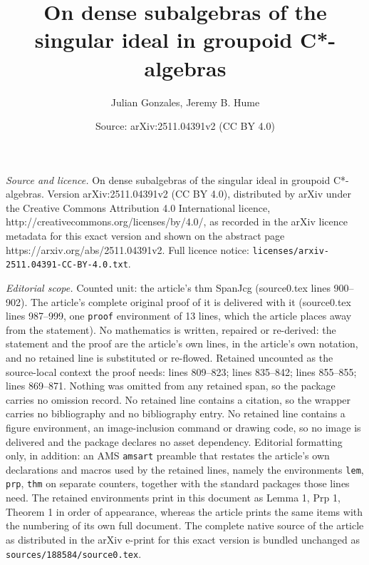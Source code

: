 \documentclass[10pt,a4paper]{amsart}
\title{On dense subalgebras of the singular ideal in groupoid C*-algebras}
\author{Julian Gonzales, Jeremy B. Hume}
\date{Source: arXiv:2511.04391v2 (CC BY 4.0)}
\begin{document}
\maketitle

\noindent\emph{Source and licence.} On dense subalgebras of the singular ideal in groupoid C*-algebras. Version arXiv:2511.04391v2 (CC BY 4.0), distributed by arXiv under the Creative Commons Attribution 4.0 International licence, http://creativecommons.org/licenses/by/4.0/, as recorded in the arXiv licence metadata for this exact version and shown on the abstract page https://arxiv.org/abs/2511.04391v2. Full licence notice: \texttt{licenses/arxiv-2511.04391-CC-BY-4.0.txt}.\par\smallskip

\noindent\textit{Editorial scope.} Counted unit: the article's thm SpanJcg (source0.tex lines 900--902). The article's complete original proof of it is delivered with it (source0.tex lines 987--999, one \texttt{proof} environment of 13 lines, which the article places away from the statement). No mathematics is written, repaired or re-derived: the statement and the proof are the article's own lines, in the article's own notation, and no retained line is substituted or re-flowed.  Retained uncounted as the source-local context the proof needs: lines 809--823; lines 835--842; lines 855--855; lines 869--871.  Nothing was omitted from any retained span, so the package carries no omission record.  No retained line contains a citation, so the wrapper carries no bibliography and no bibliography entry.  No retained line contains a figure environment, an image-inclusion command or drawing code, so no image is delivered and the package declares no asset dependency.  Editorial formatting only, in addition: an AMS \texttt{amsart} preamble that restates the article's own declarations and macros used by the retained lines, namely the environments \texttt{lem}, \texttt{prp}, \texttt{thm} on separate counters, together with the standard packages those lines need.  The retained environments print in this document as Lemma 1, Prp 1, Theorem 1 in order of appearance, whereas the article prints the same items with the numbering of its own full document.  The complete native source of the article as distributed in the arXiv e-print for this exact version is bundled unchanged as \texttt{sources/188584/source0.tex}.
\end{document}
